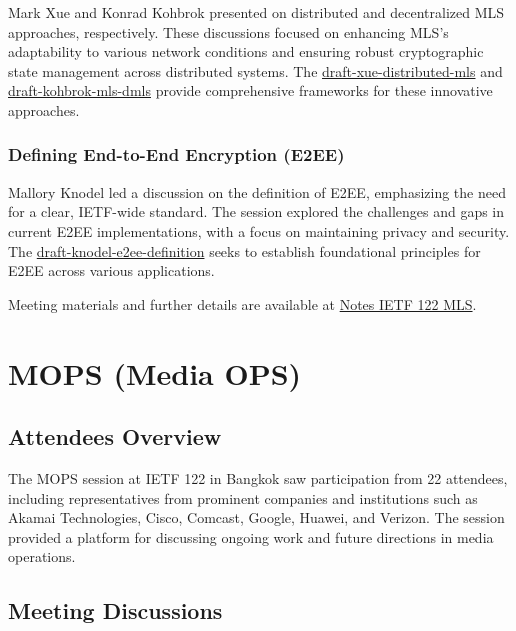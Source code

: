 \documentclass{article}
\begin{document}
Mark Xue and Konrad Kohbrok presented on distributed and decentralized MLS approaches, respectively. These discussions focused on enhancing MLS's adaptability to various network conditions and ensuring robust cryptographic state management across distributed systems. The \href{https://datatracker.ietf.org/doc/html/draft-xue-distributed-mls}{draft-xue-distributed-mls} and \href{https://datatracker.ietf.org/doc/html/draft-kohbrok-mls-dmls}{draft-kohbrok-mls-dmls} provide comprehensive frameworks for these innovative approaches.

\subsubsection{Defining End-to-End Encryption (E2EE)}

Mallory Knodel led a discussion on the definition of E2EE, emphasizing the need for a clear, IETF-wide standard. The session explored the challenges and gaps in current E2EE implementations, with a focus on maintaining privacy and security. The \href{https://datatracker.ietf.org/doc/html/draft-knodel-e2ee-definition}{draft-knodel-e2ee-definition} seeks to establish foundational principles for E2EE across various applications.

Meeting materials and further details are available at \href{https://notes.ietf.org/notes-ietf-122-mls}{Notes IETF 122 MLS}.



\newpage

\section{MOPS (Media OPS)}

\subsection{Attendees Overview}

The MOPS session at IETF 122 in Bangkok saw participation from 22 attendees, including representatives from prominent companies and institutions such as Akamai Technologies, Cisco, Comcast, Google, Huawei, and Verizon. The session provided a platform for discussing ongoing work and future directions in media operations.

\subsection{Meeting Discussions}
\end{document}
